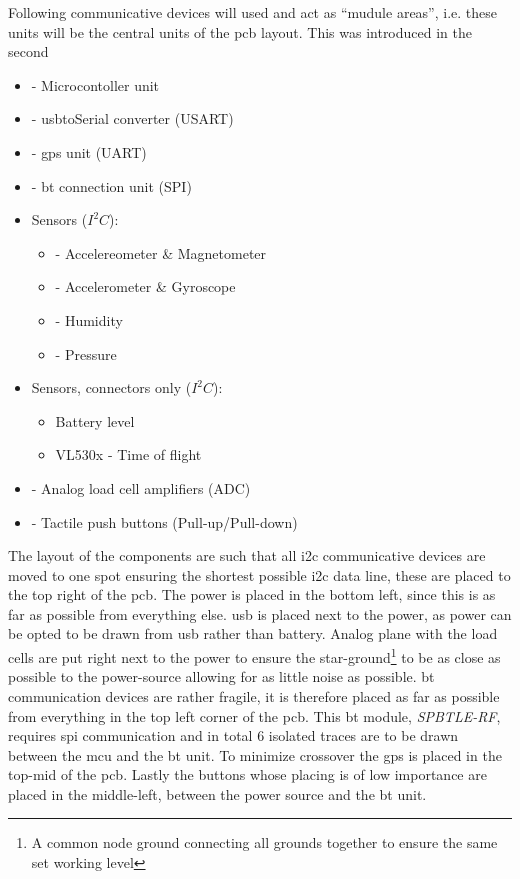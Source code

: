 Following communicative devices will used and act as ``mudule areas'', i.e. these units will be the central units of the \gls{pcb} layout. This was introduced in the second
\begin{itemize}[noitemsep]
\item{ - Microcontoller unit}
\item{ - \gls{usb}toSerial converter (USART)}
\item{ - \gls{gps} unit (UART)}
\item{ - \gls{bt} connection unit (SPI)}
\item Sensors ($I^2C$):
	\begin{itemize}[noitemsep]
	\item{ - Accelereometer \& Magnetometer}
	\item{ - Accelerometer \& Gyroscope}
	\item{ - Humidity}
	\item{ - Pressure}
	\end{itemize}
\item Sensors, connectors only ($I^2C$):
	\begin{itemize}[noitemsep]
	\item Battery level
	\item VL530x \qquad- Time of flight
	\end{itemize}
\item{ - Analog load cell amplifiers (ADC)}
\item{ - Tactile push buttons (Pull-up/Pull-down)}
\end{itemize}
The layout of the components are such that all \gls{i2c} communicative devices are moved to one spot ensuring the shortest possible \gls{i2c} data line, these are placed to the top right of the \gls{pcb}. The power is placed in the bottom left, since this is as far as possible from everything else. \gls{usb} is placed next to the power, as power can be opted to be drawn from \gls{usb} rather than battery. Analog plane with the load cells are put right next to the power to ensure the star-ground\footnote{A common node ground connecting all grounds together to ensure the same set working level} to be as close as possible to the power-source allowing for as little noise as possible. \gls{bt} communication devices are rather fragile, it is therefore placed as far as possible from everything in the top left corner of the \gls{pcb}. This \gls{bt} module, \emph{SPBTLE-RF}, requires \gls{spi} communication and in total $6$ isolated traces are to be drawn between the \gls{mcu} and the \gls{bt} unit. To minimize crossover the \gls{gps} is placed in the top-mid of the \gls{pcb}. Lastly the buttons whose placing is of low importance are placed in the middle-left, between the power source and the \gls{bt} unit. 

